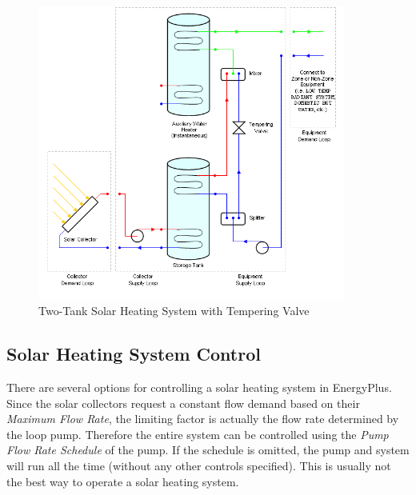 \begin{figure}[hbtp] %
\centering
\includegraphics[width=0.9\textwidth, height=0.9\textheight, keepaspectratio=true]{media/image341.png}
\caption{Two-Tank Solar Heating System with Tempering Valve \protect \label{fig:two-tank-solar-heating-system-with-tempering}}
\end{figure}

\subsection{Solar Heating System Control}\label{solar-heating-system-control}

There are several options for controlling a solar heating system in EnergyPlus. Since the solar collectors request a constant flow demand based on their \emph{Maximum Flow Rate}, the limiting factor is actually the flow rate determined by the loop pump. Therefore the entire system can be controlled using the \emph{Pump Flow Rate Schedule} of the pump. If the schedule is omitted, the pump and system will run all the time (without any other controls specified). This is usually not the best way to operate a solar heating system.

